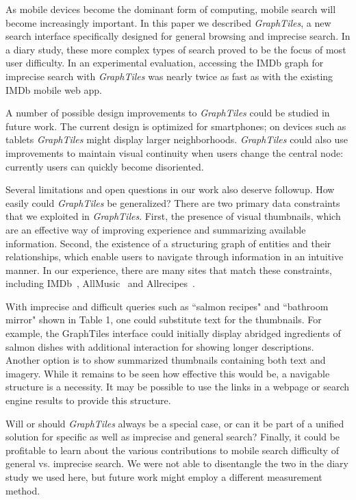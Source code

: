 As mobile devices become the dominant form of computing, mobile search will become increasingly important. In this paper we described \textit{GraphTiles}, a new search interface specifically designed for general browsing and imprecise search. In a diary study, these more complex types of search proved to be the focus of most user difficulty. In an experimental evaluation, accessing the IMDb graph for imprecise search with \textit{GraphTiles} was nearly twice as fast as with the existing IMDb mobile web app.

A number of possible design improvements to \textit{GraphTiles} could be studied in future work. The current design is optimized for smartphones; on devices such as tablets \textit{GraphTiles} might display larger neighborhoods. \textit{GraphTiles} could also use improvements to maintain visual continuity when users change the central node: currently users can quickly become disoriented. 

Several limitations and open questions in our work also deserve followup. How easily could \textit{GraphTiles} be generalized?  There are two primary data constraints that we exploited in \textit{GraphTiles}. First, the presence of visual thumbnails, which are an effective way of improving experience and summarizing available information. Second, the existence of a structuring graph of entities and their relationships, which enable users to navigate through information in an intuitive manner. In our experience, there are many sites that match these constraints, including IMDb~\cite{imdb}, AllMusic~\cite{allmusic} and Allrecipes~\cite{allrecipes}. 

With imprecise and difficult queries such as ``salmon recipes" and ``bathroom mirror" shown in Table 1, one could substitute text for the thumbnails. For example, the GraphTiles interface could initially display abridged ingredients of salmon dishes with additional interaction for showing longer descriptions. Another option is to show summarized thumbnails containing both text and imagery. While it remains to be seen how effective this would be, a navigable structure is a necessity. It may be possible to use the links in a webpage or search engine results to provide this structure.

Will or should \textit{GraphTiles} always be a special case, or can it be part of a unified solution for specific as well as imprecise and general search? Finally, it could be profitable to learn about the various contributions to mobile search difficulty of general vs. imprecise search. We were not able to disentangle the two in the diary study we used here, but future work might employ a different measurement method.
